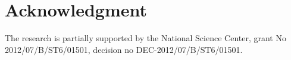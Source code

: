 \documentclass{llncs}
\begin{document}
\vspace{-6pt}
\section*{Acknowledgment}
\vspace{-5pt}
The research is partially supported  by the National Science Center, grant No 2012/07/B/ST6/01501, decision no \mbox{DEC-2012/07/B/ST6/01501}.


\vspace{-6pt}
\end{document}
